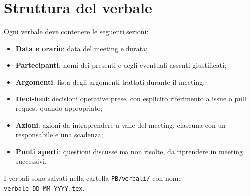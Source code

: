 \section{Struttura del verbale}

Ogni verbale deve contenere le seguenti sezioni:

\begin{itemize}
  \item \textbf{Data e orario}: data del meeting e durata;
  \item \textbf{Partecipanti}: nomi dei presenti e degli eventuali assenti giustificati;
  \item \textbf{Argomenti}: lista degli argomenti trattati durante il meeting;
  \item \textbf{Decisioni}: decisioni operative prese, con esplicito riferimento a issue o pull request quando appropriato;
  \item \textbf{Azioni}: azioni da intraprendere a valle del meeting, ciascuna con un responsabile e una scadenza;
  \item \textbf{Punti aperti}: questioni discusse ma non risolte, da riprendere in meeting successivi.
\end{itemize}

I verbali sono salvati nella cartella \texttt{PB/verbali/} con nome \texttt{verbale\_DD\_MM\_YYYY.tex}.
